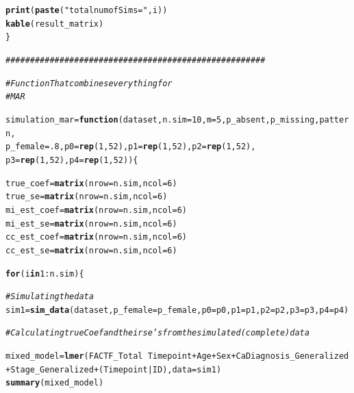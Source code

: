 \documentclass[fleqn,10pt]{wlscirep}\usepackage[]{graphicx}\usepackage[]{color}
\makeatletter
\newcommand{\hlnum}[1]{\textcolor[rgb]{0.686,0.059,0.569}{#1}}%
\newcommand{\hlstr}[1]{\textcolor[rgb]{0.192,0.494,0.8}{#1}}%
\newcommand{\hlcom}[1]{\textcolor[rgb]{0.678,0.584,0.686}{\textit{#1}}}%
\newcommand{\hlopt}[1]{\textcolor[rgb]{0,0,0}{#1}}%
\newcommand{\hlstd}[1]{\textcolor[rgb]{0.345,0.345,0.345}{#1}}%
\newcommand{\hlkwa}[1]{\textcolor[rgb]{0.161,0.373,0.58}{\textbf{#1}}}%
\newcommand{\hlkwb}[1]{\textcolor[rgb]{0.69,0.353,0.396}{#1}}%
\newcommand{\hlkwc}[1]{\textcolor[rgb]{0.333,0.667,0.333}{#1}}%
\newcommand{\hlkwd}[1]{\textcolor[rgb]{0.737,0.353,0.396}{\textbf{#1}}}%
\newenvironment{kframe}{%
 \def\at@end@of@kframe{}%
 \ifinner\ifhmode%
  \def\at@end@of@kframe{\end{minipage}}%
  \begin{minipage}{\columnwidth}%
 \fi\fi%
 \def\FrameCommand##1{\hskip\@totalleftmargin \hskip-\fboxsep
 \colorbox{shadecolor}{##1}\hskip-\fboxsep
     \hskip-\linewidth \hskip-\@totalleftmargin \hskip\columnwidth}%
 \MakeFramed {\advance\hsize-\width
   \@totalleftmargin\z@ \linewidth\hsize
   \@setminipage}}%
 {\par\unskip\endMakeFramed%
 \at@end@of@kframe}
\newenvironment{knitrout}{}{} %
\makeatother
\begin{document}
\begin{knitrout}
\begin{kframe}
\begin{alltt}
    \hlkwd{print}\hlstd{(}\hlkwd{paste}\hlstd{(}\hlstr{"total num of Sims = "}\hlstd{, i))}
    \hlkwd{kable}\hlstd{(result_matrix)}
  \hlstd{\}}


\hlcom{#####################################################}

\hlcom{# Function That combines everything for }
\hlcom{# MAR }

\hlstd{simulation_mar} \hlkwb{=} \hlkwa{function}\hlstd{(}\hlkwc{dataset}\hlstd{,} \hlkwc{n.sim} \hlstd{=} \hlnum{10}\hlstd{,} \hlkwc{m} \hlstd{=} \hlnum{5}\hlstd{,} \hlkwc{p_absent}\hlstd{,} \hlkwc{p_missing}\hlstd{,} \hlkwc{pattern}\hlstd{,}
                          \hlkwc{p_female}\hlstd{=}\hlnum{.8}\hlstd{,} \hlkwc{p0}\hlstd{=}\hlkwd{rep}\hlstd{(}\hlnum{1}\hlstd{,}\hlnum{52}\hlstd{),} \hlkwc{p1}\hlstd{=}\hlkwd{rep}\hlstd{(}\hlnum{1}\hlstd{,}\hlnum{52}\hlstd{),} \hlkwc{p2}\hlstd{=}\hlkwd{rep}\hlstd{(}\hlnum{1}\hlstd{,}\hlnum{52}\hlstd{),}
                          \hlkwc{p3}\hlstd{=}\hlkwd{rep}\hlstd{(}\hlnum{1}\hlstd{,}\hlnum{52}\hlstd{),} \hlkwc{p4}\hlstd{=}\hlkwd{rep}\hlstd{(}\hlnum{1}\hlstd{,}\hlnum{52}\hlstd{)) \{}

  \hlstd{true_coef} \hlkwb{=} \hlkwd{matrix}\hlstd{(}\hlkwc{nrow} \hlstd{= n.sim,} \hlkwc{ncol} \hlstd{=} \hlnum{6}\hlstd{)}
  \hlstd{true_se} \hlkwb{=} \hlkwd{matrix}\hlstd{(}\hlkwc{nrow} \hlstd{= n.sim,} \hlkwc{ncol} \hlstd{=} \hlnum{6}\hlstd{)}
  \hlstd{mi_est_coef} \hlkwb{=} \hlkwd{matrix}\hlstd{(}\hlkwc{nrow} \hlstd{= n.sim,} \hlkwc{ncol} \hlstd{=} \hlnum{6}\hlstd{)}
  \hlstd{mi_est_se} \hlkwb{=} \hlkwd{matrix}\hlstd{(}\hlkwc{nrow} \hlstd{= n.sim,} \hlkwc{ncol} \hlstd{=} \hlnum{6}\hlstd{)}
  \hlstd{cc_est_coef} \hlkwb{=} \hlkwd{matrix}\hlstd{(}\hlkwc{nrow} \hlstd{= n.sim,} \hlkwc{ncol} \hlstd{=} \hlnum{6}\hlstd{)}
  \hlstd{cc_est_se} \hlkwb{=} \hlkwd{matrix}\hlstd{(}\hlkwc{nrow} \hlstd{= n.sim,} \hlkwc{ncol} \hlstd{=} \hlnum{6}\hlstd{)}

  \hlkwa{for} \hlstd{(i} \hlkwa{in} \hlnum{1}\hlopt{:}\hlstd{n.sim)\{}

    \hlcom{# Simulating the data }
    \hlstd{sim1} \hlkwb{=} \hlkwd{sim_data}\hlstd{(dataset,} \hlkwc{p_female} \hlstd{= p_female,} \hlkwc{p0}\hlstd{=p0,} \hlkwc{p1}\hlstd{=p1,} \hlkwc{p2}\hlstd{=p2,} \hlkwc{p3}\hlstd{=p3,} \hlkwc{p4}\hlstd{=p4)}

    \hlcom{# Calculating true Coef and their se's from the simulated (complete) data}

    \hlstd{mixed_model} \hlkwb{=} \hlkwd{lmer}\hlstd{(FACTF_Total} \hlopt{~} \hlstd{Timepoint} \hlopt{+} \hlstd{Age} \hlopt{+} \hlstd{Sex} \hlopt{+} \hlstd{CaDiagnosis_Generalized} \hlopt{+} \hlstd{Stage_Generalized} \hlopt{+} \hlstd{(Timepoint}\hlopt{|}\hlstd{ID),} \hlkwc{data} \hlstd{= sim1)}
    \hlkwd{summary}\hlstd{(mixed_model)}


\end{alltt}
\end{kframe}
\end{knitrout}
\end{document}
